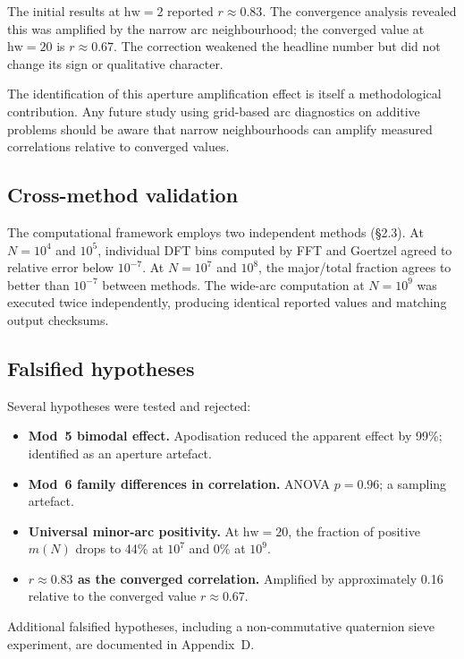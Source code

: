 \documentclass[11pt,a4paper]{article}
\newcommand{\mN}{m(N)}
\begin{document}
The initial results at $\mathrm{hw} = 2$ reported $r \approx 0.83$. The convergence analysis revealed this was amplified by the narrow arc neighbourhood; the converged value at $\mathrm{hw} = 20$ is $r \approx 0.67$. The correction weakened the headline number but did not change its sign or qualitative character.

The identification of this aperture amplification effect is itself a methodological contribution. Any future study using grid-based arc diagnostics on additive problems should be aware that narrow neighbourhoods can amplify measured correlations relative to converged values.


\subsection{Cross-method validation}

The computational framework employs two independent methods (\S2.3). At $N = 10^4$ and $10^5$, individual DFT bins computed by FFT and Goertzel agreed to relative error below $10^{-7}$. At $N = 10^7$ and $10^8$, the major/total fraction agrees to better than $10^{-7}$ between methods. The wide-arc computation at $N = 10^9$ was executed twice independently, producing identical reported values and matching output checksums.


\subsection{Falsified hypotheses}

Several hypotheses were tested and rejected:
\begin{itemize}
\item \textbf{Mod~5 bimodal effect.} Apodisation reduced the apparent effect by 99\%; identified as an aperture artefact.
\item \textbf{Mod~6 family differences in correlation.} ANOVA $p = 0.96$; a sampling artefact.
\item \textbf{Universal minor-arc positivity.} At $\mathrm{hw} = 20$, the fraction of positive $\mN$ drops to 44\% at $10^7$ and 0\% at $10^9$.
\item \textbf{$r \approx 0.83$ as the converged correlation.} Amplified by approximately 0.16 relative to the converged value $r \approx 0.67$.
\end{itemize}

Additional falsified hypotheses, including a non-commutative quaternion sieve experiment, are documented in Appendix~D.
\end{document}
